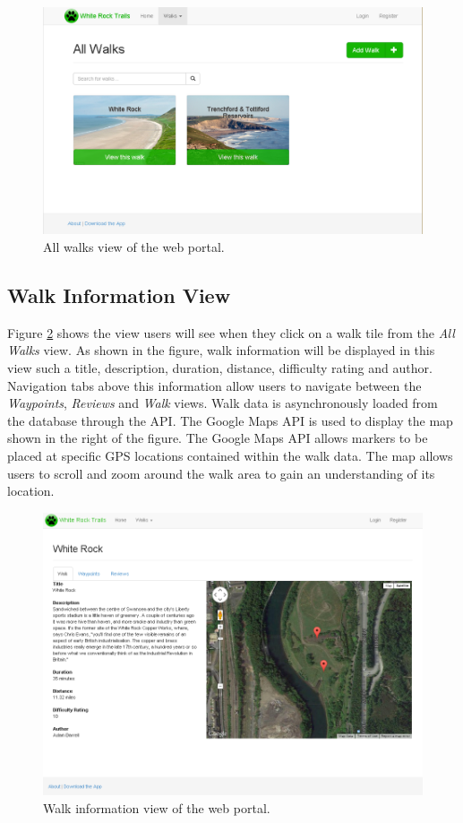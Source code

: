 \documentclass[11pt,a4paper]{article}
\begin{document}
\begin{figure}[H]
\centering
\includegraphics[width=0.8\linewidth]{./img/webportal/all-walks}
\caption{All walks view of the web portal.}
\label{fig:all-walks}
\end{figure}

\subsection{Walk Information View}

Figure \ref{fig:walk-info} shows the view users will see when they click on a walk tile from the \emph{All Walks} view. As shown in the figure, walk information will be displayed in this view such a title, description, duration, distance, difficulty rating and author. Navigation tabs above this information allow users to navigate between the \emph{Waypoints}, \emph{Reviews} and \emph{Walk} views. Walk data is asynchronously loaded from the database through the API. The Google Maps API is used to display the map shown in the right of the figure. The Google Maps API allows markers to be placed at specific GPS locations contained within the walk data. The map allows users to scroll and zoom around the walk area to gain an understanding of its location.

\begin{figure}[H]
\centering
\includegraphics[width=0.8\linewidth]{./img/webportal/walk-info}
\caption{Walk information view of the web portal.}
\label{fig:walk-info}
\end{figure}
\end{document}

